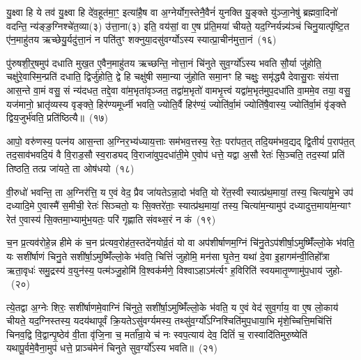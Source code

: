 यु॒क्ष्वा हि ये तव॑ यु॒क्ष्वा हि दे॑व॒हूत॑मा॒ꣳ॒ इत्या॑है॒ष वा अ॒ग्नेर्योग॒स्तेनै॒वैनं॑ युनक्ति यु॒ङ्क्ते यु॑ञ्जा॒नेषु॑ ब्रह्मवा॒दिनो॑ वदन्ति॒ न्य॑ङ्ङ॒ग्निश्चे॑त॒व्या(३) उ॑त्ता॒ना(३) इति॒ वय॑सां॒ वा ए॒ष प्र॑ति॒मया॑ चीयते॒ यद॒ग्निर्यन्न्य॑ञ्चं चिनु॒यात्पृ॑ष्टि॒त ए॑न॒माहु॑तय ऋच्छेयु॒र्यदु॑त्ता॒नं न पति॑तुꣳ शक्नुया॒दसु॑वर्ग्यो\-ऽस्य स्यात्प्रा॒चीन॑मुत्ता॒नं~(१६)\ip

पु॑रुषशी॒र्॒\mbox{}षमुप॑ दधाति मुख॒त ए॒वैन॒माहु॑तय ऋच्छन्ति॒ नोत्ता॒नं चि॑नुते सुव॒र्ग्यो᳚\-ऽस्य भवति सौ॒र्या जु॑होति॒ चक्षु॑रे॒वास्मि॒न्प्रति॑ दधाति॒ द्विर्जु॑होति॒ द्वे हि चक्षु॑षी समा॒न्या जु॑होति समा॒नꣳ हि चक्षुः॒ समृ॑द्ध्यै देवासु॒राः संय॑त्ता आस॒न्ते वा॒मं वसु॒ सं न्य॑दधत॒ तद्दे॒वा वा॑म॒भृता॑वृञ्जत॒ तद्वा॑म॒भृतो॑ वामभृ॒त्त्वं यद्वा॑म॒भृत॑मुप॒\-दधा॑ति वा॒ममे॒व तया॒ वसु॒ यज॑मानो॒ भ्रातृ॑व्यस्य वृङ्क्ते॒ हिर॑ण्यमूर्ध्नी भवति॒ ज्योति॒र्वै हिर॑ण्यं॒ ज्योति॑र्वा॒मं ज्योति॑षै॒वास्य॒ ज्योति॑र्वा॒मं वृ॑ङ्क्ते द्विय॒जुर्भ॑वति॒ प्रति॑ष्ठित्यै॥~(१७)\ip

{\anuvakamend[{यु॒ञ्जा॒नेष्वग्ने᳚ प्रा॒चीन॑मुत्ता॒नं वा॑म॒भृत॒ञ्चतु॑र्विꣳशतिश्च}]}

आपो॒ वरु॑णस्य॒ पत्न॑य आस॒न्ता अ॒ग्निर॒भ्य॑ध्याय॒त्ताः सम॑भव॒त्तस्य॒ रेतः॒ परा॑पत॒त् तदि॒यम॑भव॒द्यद् द्वि॒तीयं॑ प॒राप॑त॒त् तद॒सा\-व॑भवदि॒यं वै वि॒राड॒सौ स्व॒राड्यद् वि॒राजा॑वुप॒\-दधा॑ती॒मे ए॒वोप॑ धत्ते॒ यद्वा अ॒सौ रेतः॑ सि॒ञ्चति॒ तद॒स्यां प्रति॑ तिष्ठति॒ तत्प्र जा॑यते॒ ता ओष॑धयो~(१८)\ip

वी॒रुधो॑ भवन्ति॒ ता अ॒ग्निर॑त्ति॒ य ए॒वं वेद॒ प्रैव जा॑यते\-ऽन्ना॒दो भ॑वति॒ यो रे॑त॒स्वी स्यात्प्र॑थ॒मायां॒ तस्य॒ चित्या॑मु॒भे उप॑ दध्यादि॒मे ए॒वास्मै॑ स॒मीची॒ रेतः॑ सिञ्चतो॒ यः सि॒क्तरे॑ताः॒ स्यात्प्र॑थ॒मायां॒ तस्य॒ चित्या॑म॒न्यामुप॑ दध्यादुत्त॒माया॑\-म॒न्याꣳ रेत॑ ए॒वास्य॑ सि॒क्तमा॒भ्यामु॑भ॒यतः॒ परि॑ गृह्णाति संवथ्स॒रं न कं~(१९)\ip

च॒न प्र॒त्यव॑रोहे॒न्न हीमे कं च॒न प्र॑त्यव॒रोह॑त॒स्तदे॑नयोर्व्र॒तं यो वा अप॑शीर्\mbox{}षाणम॒ग्निं चि॑नु॒ते\-ऽप॑शीर्\mbox{}षा॒\-ऽमुष्मिँ॑ल्लो॒के भ॑वति॒ यः सशी॑र्\mbox{}षाणं चिनु॒ते सशी॑र्\mbox{}षा॒\-ऽमुष्मिँ॑ल्लो॒के भ॑वति॒ चित्तिं॑ जुहोमि॒ मन॑सा घृ॒तेन॒ यथा॑ दे॒वा इ॒हागम॑न्वी॒तिहो᳚त्रा ऋता॒वृधः॑ समु॒द्रस्य॑ व॒युन॑स्य॒ पत्म॑ञ्जु॒होमि॑ वि॒श्वक॑र्मणे॒ विश्वा\-ऽहा\-ऽम॑र्त्यꣳ ह॒विरिति॑ स्वयमा\-तृ॒ण्णामु॑प॒धाय॑ जुहो-~(२०)\ip

त्ये॒तद्वा अ॒ग्नेः शिरः॒ सशी॑र्\mbox{}षाणमे॒वाग्निं चि॑नुते॒ सशी॑र्\mbox{}षा॒\-ऽमुष्मिँ॑ल्लो॒के भ॑वति॒ य ए॒वं वेद॑ सुव॒र्गाय॒ वा ए॒ष लो॒काय॑ चीयते॒ यद॒ग्निस्तस्य॒ यदय॑थापूर्वं क्रि॒यते\-ऽसु॑वर्ग्यमस्य॒ तथ्सु॑व॒र्ग्यो᳚\-ऽग्निश्चिति॑मुप॒धाया॒भि मृ॑शे॒च्चित्ति॒मचि॑त्तिं चिनव॒द्वि वि॒द्वान्पृ॒ष्ठेव॑ वी॒ता वृ॑जि॒ना च॒ मर्ता᳚न्रा॒ये च॑ नः स्वप॒त्याय॑ देव॒ दितिं॑ च॒ रास्वादि॑तिमुरु॒ष्येति॑ यथापू॒र्वमे॒वैना॒मुप॑ धत्ते॒ प्राञ्च॑मेनं चिनुते सुव॒र्ग्यो᳚\-ऽस्य भवति॥~(२१)\ip

